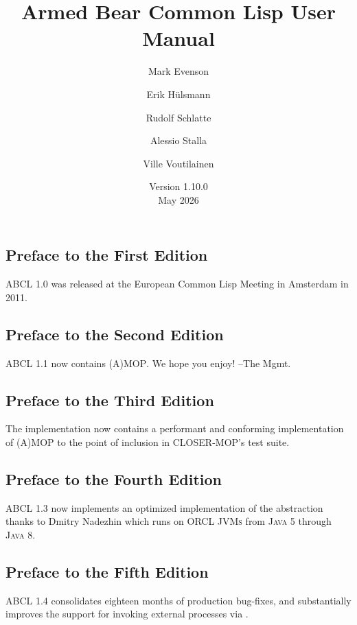 \documentclass[10pt]{book}
\begin{document}
\title{Armed Bear Common Lisp User Manual}
\date{Version 1.10.0  \\
\smallskip
May 2026}
\author{Mark Evenson \and Erik H\"{u}lsmann \and Rudolf Schlatte \and
  Alessio Stalla \and Ville Voutilainen}

\maketitle

\tableofcontents

\subsection{Preface to the First Edition}
\textsc{ABCL} 1.0 was released at the European Common Lisp Meeting
in Amsterdam in 2011.

\subsection{Preface to the Second Edition}
\textsc{ABCL} 1.1 now contains \textsc{(A)MOP}.  We hope you enjoy!
--The Mgmt.

\subsection{Preface to the Third Edition}
The implementation now contains a performant and conforming
implementation of \textsc{(A)MOP} to the point of inclusion in
\textsc{CLOSER-MOP}'s test suite.

\subsection{Preface to the Fourth Edition}

\textsc{ABCL} 1.3 now implements an optimized implementation of the
 abstraction thanks to Dmitry
Nadezhin which runs on ORCL \textsc{JVMs} from \textsc{Java 5} through
\textsc{Java 8}.

\subsection{Preface to the Fifth Edition}

\textsc{ABCL} 1.4 consolidates eighteen months of production bug-fixes,
and substantially improves the support for invoking external
processes via .
\end{document}
